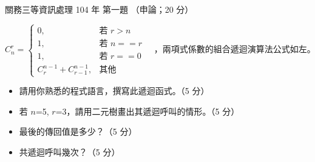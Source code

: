 \begin{pastexam}[label={px:gw3-104-ds-01}]{關務三等資訊處理 104 年 第一題}
（申論；20 分）

\[
C^{r}_{n} = \begin{cases} 0, & \text{若 } r > n \\ 1, & \text{若 } n == r \\ 1, & \text{若 } r == 0 \\
C^{n-1}_{r} + C^{n-1}_{r-1}, & \text{其他} \end{cases}
\quad\text{，兩項式係數的組合遞迴演算法公式如左。}
\]
\begin{itemize}[leftmargin=2.2em, nosep]
\item[㈠] 請用你熟悉的程式語言，撰寫此遞迴函式。（5 分）
\item[㈡] 若 $n$=5, $r$=3，請用二元樹畫出其遞迴呼叫的情形。（5 分）
\item[㈢] 最後的傳回值是多少？（5 分）
\item[㈣] 共遞迴呼叫幾次？（5 分）
\end{itemize}
\end{pastexam}

